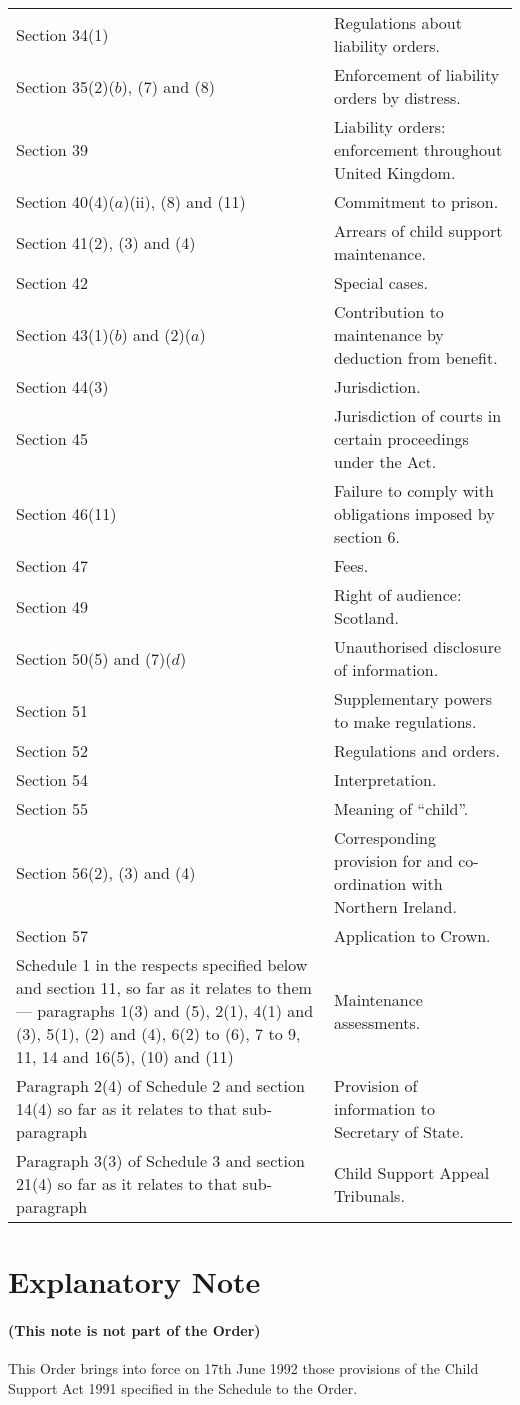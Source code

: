 \documentclass[a4paper,12pt]{article}
\begin{document}
{\begin{longtable}{p{237.78516pt}p{128.21193pt}}
Section 34(1)&Regulations about liability orders.\\
Section 35(2)($b$), (7) and (8)&Enforcement of liability orders by distress.\\
Section 39&{Liability orders: enforcement throughout United} Kingdom.\\
Section 40(4)($a$)(ii), (8) and (11)&Commitment to prison.\\
Section 41(2), (3) and (4)&{Arrears of child support} maintenance.\\
Section 42&Special cases.\\
Section 43(1)($b$) and (2)($a$)&Contribution to maintenance by deduction from benefit.\\
Section 44(3)&Jurisdiction.\\
Section 45&Jurisdiction of courts in certain proceedings under the Act.\\
Section 46(11)&Failure to comply with obligations imposed by section 6.\\
Section 47&Fees.\\
Section 49&Right of audience: Scotland.\\
Section 50(5) and (7)($d$)&Unauthorised disclosure of information.\\
Section 51&Supplementary powers to make regulations.\\
Section 52&Regulations and orders.\\
Section 54&Interpretation.\\
Section 55&Meaning of “child”.\\
Section 56(2), (3) and (4)&{Corresponding provision} for and co-\hspace{0pt}ordination with Northern Ireland.\\
Section 57&Application to Crown.\\
Schedule 1 in the respects specified below and section 11, so far as it relates to them— paragraphs 1(3) and (5), 2(1), 4(1) and (3), 5(1), (2) and (4), 6(2) to (6), 7 to 9, 11, 14 and 16(5), (10) and (11)&Maintenance assessments.\\
Paragraph 2(4) of Schedule 2 and section 14(4) so far as it relates to that sub-paragraph&Provision of information to Secretary of State.\\
Paragraph 3(3) of Schedule 3 and section 21(4) so far as it relates to that sub-paragraph&Child Support Appeal Tribunals.\\
\end{longtable}
}

\part{Explanatory Note}

\subsection*{(This note is not part of the Order)}

 This Order brings into force on 17th June 1992 those provisions of the Child Support Act 1991 specified in the Schedule to the Order.
\end{document}
